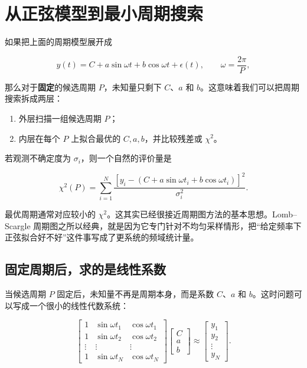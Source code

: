 \section{从正弦模型到最小周期搜索}

如果把上面的周期模型展开成

\[
y(t) = C + a\sin\omega t + b\cos\omega t + \epsilon(t),
\qquad \omega = \frac{2\pi}{P},
\]

那么对于\textbf{固定}的候选周期 $P$，未知量只剩下 $C$、$a$ 和 $b$。这意味着我们可以把周期搜索拆成两层：

\begin{enumerate}
    \item 外层扫描一组候选周期 $P$；
    \item 内层在每个 $P$ 上拟合最优的 $C,a,b$，并比较残差或 $\chi^2$。
\end{enumerate}

若观测不确定度为 $\sigma_i$，则一个自然的评价量是

\[
\chi^2(P) = \sum_{i=1}^{N}
\frac{\left[y_i - \left(C + a\sin\omega t_i + b\cos\omega t_i\right)\right]^2}{\sigma_i^2}.
\]

最优周期通常对应较小的 $\chi^2$。这其实已经很接近周期图方法的基本思想。Lomb--Scargle 周期图之所以经典，就是因为它专门针对不均匀采样情形，把“给定频率下正弦拟合好不好”这件事写成了更系统的频域统计量。

\subsection{固定周期后，求的是线性系数}

当候选周期 $P$ 固定后，未知量不再是周期本身，而是系数 $C$、$a$ 和 $b$。这时问题可以写成一个很小的线性代数系统：

\[
\begin{bmatrix}
1 & \sin \omega t_1 & \cos \omega t_1 \\
1 & \sin \omega t_2 & \cos \omega t_2 \\
\vdots & \vdots & \vdots \\
1 & \sin \omega t_N & \cos \omega t_N
\end{bmatrix}
\begin{bmatrix}
C \\ a \\ b
\end{bmatrix}
\approx
\begin{bmatrix}
y_1 \\ y_2 \\ \vdots \\ y_N
\end{bmatrix}.
\]

